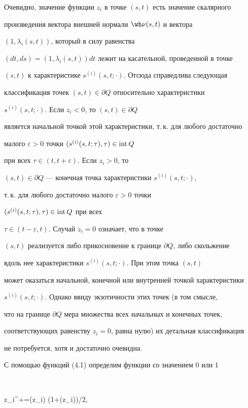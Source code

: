 Очевидно, значение функции $z_i$ в точке $(s,t)$ есть значение скалярного 


произведения вектора внешней нормали $\wh \nu (s,t)$ и вектора 


$(1, \lambda_i (s,t))$, который в силу равенства 


$(dt,ds)=(1, \lambda_i (s,t)) dt$ лежит на касательной, проведенной в точке


$(s,t)$ к характеристике $s^{(i)} (s,t; \cdot)$. Отсюда справедлива следующая 


классификация точек $(s,t) \in \partial Q$ относительно характеристики


$s^{(i)} (s,t; \cdot)$. Если $z_i < 0$, то $(s,t) \in \partial Q$


является начальной точкой этой характеристики, т.\,к. для любого достаточно 


малого $\varepsilon > 0$ точки $(s^{(i)} (s,t; \tau), \tau) \in \operatorname{int} Q$


при всех $\tau \in (t,t+\varepsilon)$. Если $z_i > 0$, то 


$(s,t) \in \partial Q$ --- конечная точка характеристики $s^{(i)} (s,t; \cdot)$,


т.\,к. для любого достаточно малого $\varepsilon > 0$ точки


$(s^{(i)} (s,t; \tau), \tau) \in \operatorname{int} Q$ при всех 


$\tau \in (t-\varepsilon, t)$. Случай $z_i=0$ означает, что в точке


$(s,t)$ реализуется либо прикосновение к границе $\partial Q$, либо скольжение 


вдоль нее характеристики $s^{(i)} (s,t; \cdot)$. При этом точка $(s,t)$ 


может оказаться начальной, конечной или внутренней точкой характеристики


$s^{(i)} (s,t; \cdot)$. Однако ввиду экзотичности этих точек (в том смысле, 


что на границе $\partial Q$ мера множества всех начальных и конечных точек,


соответствующих равенству $z_i=0$, равна нулю) их детальная классификация 


не потребуется, хотя и достаточно очевидна.





С помощью функций (4.1) определим функции со значением 0 или 1


$$


z_i^{+}=\sign (z_i) (1+\sign (z_i))/2,\quad


